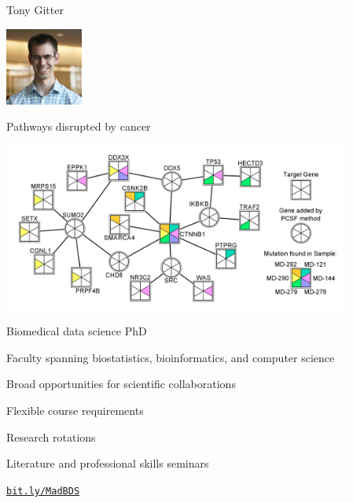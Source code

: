 \documentclass[12pt,t,aspectratio=169]{beamer}
\begin{document}
\begin{frame}{Tony Gitter}

\hspace*{0.85\textwidth}
\includegraphics[height=1in]{Pics/tony_gitter.jpg}
\vspace*{-30mm}

{\large Pathways disrupted by cancer}

\bigskip

\includegraphics[height=55mm]{Pics/tony_gitter_MultiPCSF.png}


\end{frame}


\begin{frame}{Biomedical data science PhD}

    \bbi
  \item Faculty spanning biostatistics, bioinformatics, and computer
    science
  \item Broad opportunities for scientific collaborations
  \item Flexible course requirements
  \item Research rotations
  \item Literature and professional skills seminars
    \ei


\bigskip \bigskip

\centerline{\href{https://bit.ly/MadBDS}{\Large \tt bit.ly/MadBDS}}

\end{frame}
\end{document}
